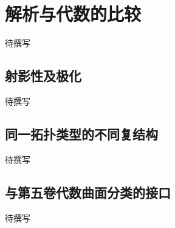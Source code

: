 
% 
% 
% 

\section{解析与代数的比较}
\label{g4:sec:3004}

待撰写

\subsection{射影性及极化}
\label{g4:subsec:3004:01}
待撰写

\subsection{同一拓扑类型的不同复结构}
\label{g4:subsec:3004:02}
待撰写

\subsection{与第五卷代数曲面分类的接口}
\label{g4:subsec:3004:03}
待撰写
